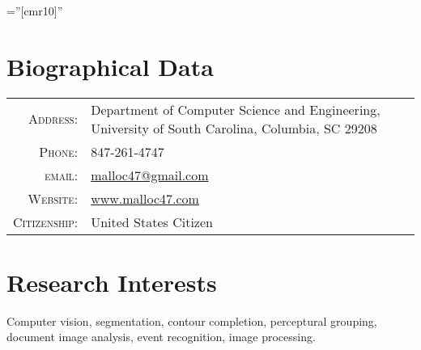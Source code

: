 \documentclass[a4paper,10pt]{article}
\begin{document}
\pagestyle{empty}

\font\fb=''[cmr10]''

\par{\bigskip\par}

\section{Biographical Data}

\begin{tabular}{r p{3.5in}}
	\textsc{Address:}	& Department of Computer Science and Engineering, University of South Carolina, Columbia, SC 29208 \\
    \textsc{Phone:}     & 847-261-4747\\
    \textsc{email:}     & \href{mailto:malloc47@gmail.com}{malloc47@gmail.com} \\
	\textsc{Website:}	& \href{http://www.malloc47.com}{www.malloc47.com} \\
	\textsc{Citizenship:} & United States Citizen \\
\end{tabular}

\section{Research Interests}

Computer vision, segmentation, contour completion, perceptural grouping, document image analysis, event recognition, image processing.
\end{document}
